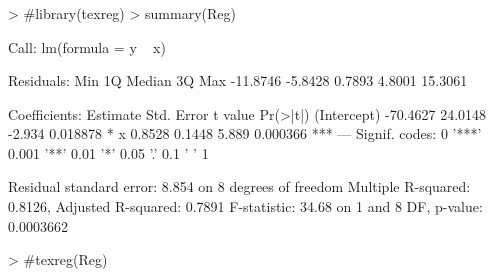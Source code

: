\documentclass[14pt,aspectratio=1610]{beamer}
\begin{document}
\begin{frame}[fragile]{}
\frametitle{ }
\begin{block}{}
\begin{center}
\begin{Schunk}
\begin{Sinput}
> #library(texreg)
> summary(Reg)
\end{Sinput}
\begin{Soutput}
Call:
lm(formula = y ~ x)

Residuals:
     Min       1Q   Median       3Q      Max 
-11.8746  -5.8428   0.7893   4.8001  15.3061 

Coefficients:
            Estimate Std. Error t value Pr(>|t|)    
(Intercept) -70.4627    24.0148  -2.934 0.018878 *  
x             0.8528     0.1448   5.889 0.000366 ***
---
Signif. codes:  0 '***' 0.001 '**' 0.01 '*' 0.05 '.' 0.1 ' ' 1

Residual standard error: 8.854 on 8 degrees of freedom
Multiple R-squared:  0.8126,	Adjusted R-squared:  0.7891 
F-statistic: 34.68 on 1 and 8 DF,  p-value: 0.0003662
\end{Soutput}
\begin{Sinput}
> #texreg(Reg)
\end{Sinput}
\end{Schunk}
\end{center}
\end{block}
\end{frame}
\end{document}
